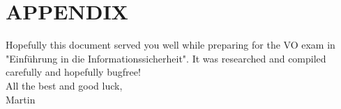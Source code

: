 \documentclass[a4paper, 10 pt, conference]{ieeeconf}
\begin{document}
\pagebreak
\section*{APPENDIX}
Hopefully this document served you well while preparing for the VO exam in "Einführung in die Informationssicherheit". It was researched and compiled carefully and hopefully bugfree!
\\ All the best and good luck,\\
Martin
\end{document}
